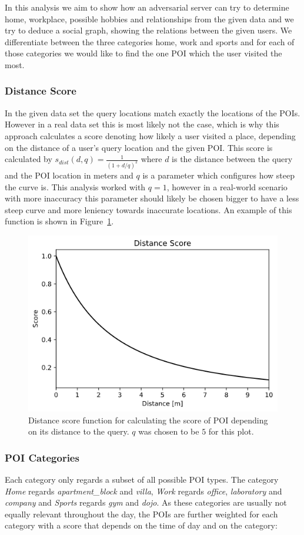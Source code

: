 \documentclass[9pt,conference]{IEEEtran}
\begin{document}
In this analysis we aim to show how an adversarial server can try to determine home, workplace, possible hobbies and relationships from the given data and we try to deduce a social graph, showing the relations between the given users. We differentiate between the three categories home, work and sports and for each of those categories we would like to find the one POI which the user visited the most.

\subsubsection{Distance Score}
In the given data set the query locations match exactly the locations of the POIs. However in a real data set this is most likely not the case, which is why this approach calculates a score denoting how likely a user visited a place, depending on the distance of a user's query location and the given POI. This score is calculated by ${s_{dist}(d, q) = \frac{1}{(1+d/q)^2}}$ where $d$ is the distance between the query and the POI location in meters and $q$ is a parameter which configures how steep the curve is. This analysis worked with $q = 1$, however in a real-world scenario with more inaccuracy this parameter should likely be chosen bigger to have a less steep curve and more leniency towards inaccurate locations. An example of this function is shown in Figure~\ref{fig:distance-score}.

\begin{figure}
    \centering
    \includegraphics[width=0.55\linewidth]{images/distance-score.png}
    \caption{Distance score function for calculating the score of POI depending on its distance to the query. $q$ was chosen to be $5$ for this plot.}
    \label{fig:distance-score}
\end{figure}

\subsubsection{POI Categories}
Each category only regards a subset of all possible POI types. The category \textit{Home} regards \textit{apartment\_block} and \textit{villa}, \textit{Work} regards \textit{office}, \textit{laboratory} and \textit{company} and \textit{Sports} regards \textit{gym} and \textit{dojo}. As these categories are usually not equally relevant throughout the day, the POIs are further weighted for each category with a score that depends on the time of day and on the category:
\end{document}
